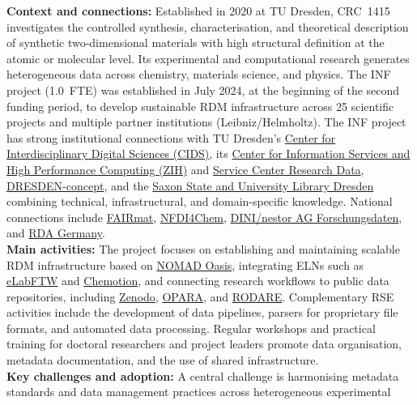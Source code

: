 \documentclass{eceasst}
\begin{document}
\noindent\textbf{Context and connections:}
Established in 2020 at TU Dresden, CRC~1415 investigates the controlled
synthesis, characterisation, and theoretical description of
synthetic two-dimensional materials with high structural definition at the atomic or molecular level.
Its experimental and
computational research generates heterogeneous data across
chemistry, materials science, and physics.
The INF project (1.0~FTE) was established in July 2024, at the beginning
of the second funding period, to develop sustainable RDM
infrastructure across 25 scientific projects
and multiple partner institutions (Leibniz/Helmholtz).
The INF project has strong institutional connections with TU
Dresden’s \href{https://tu-dresden.de/cids}{Center for Interdisciplinary Digital Sciences (CIDS)}, its \href{https://tu-dresden.de/cids/departments/zih/zih}{Center for Information Services and High Performance Computing (ZIH)} and
\href{https://tu-dresden.de/forschung-transfer/services-fuer-forschende/kontaktstelle-forschungsdaten}{Service Center Research Data},
\href{https://dresden-concept.de}{DRESDEN-concept},
and the \href{https://www.slub-dresden.de}{Saxon State and University Library Dresden}
combining technical, infrastructural, and domain-specific knowledge. National connections
include \href{https://www.fairmat-nfdi.eu/}{FAIRmat},
\href{https://nfdi4chem.de/}{NFDI4Chem}, \href{https://dini.de/ag/dininestor-ag-forschungsdaten}{DINI/nestor AG Forschungsdaten},
and \href{https://www.rda-deutschland.de/}{RDA Germany}.
\\
\noindent\textbf{Main activities:}
The project focuses on establishing and maintaining scalable
RDM infrastructure based on
\href{https://nomad-lab.eu/nomad-lab/nomad-oasis.html}
{NOMAD Oasis}, integrating ELNs such as \href{https://www.elabftw.net/}{eLabFTW}
and \href{https://chemotion.net/}{Chemotion},
and connecting research workflows
to public data repositories, including
\href{https://zenodo.org/communities/crc1415/about}{Zenodo},
\href{https://opara.zih.tu-dresden.de/}{OPARA}, and
\href{https://rodare.hzdr.de/communities/crc1415}{RODARE}.
Complementary RSE activities
include the development of data pipelines, parsers for
proprietary file formats, and automated data processing.
Regular workshops and practical training for doctoral
researchers and project leaders promote data organisation,
metadata documentation, and the use of shared infrastructure.
\\
\noindent\textbf{Key challenges and adoption:}
A central challenge is harmonising metadata standards and
data management practices across heterogeneous experimental
\end{document}
